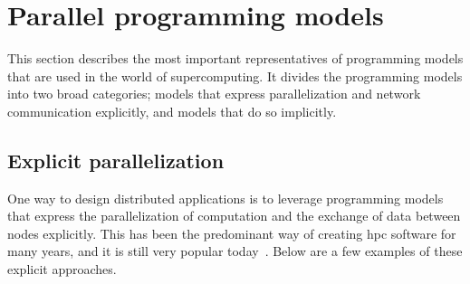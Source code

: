 \section{Parallel programming models}
This section describes the most important representatives of programming models that are used in
the world of supercomputing. It divides the programming models into two broad categories; models
that express parallelization and network communication explicitly, and models that do so
implicitly.

\subsection*{Explicit parallelization}
One way to design distributed applications is to leverage programming models that express the
parallelization of computation and the exchange of data between nodes explicitly. This has been the
predominant way of creating \gls{hpc} software for many years, and it is still very
popular today~\cite{mpiusagestudy1,mpiusagestudy2,mpiusagestudy3}. Below are a few examples of these explicit approaches.

